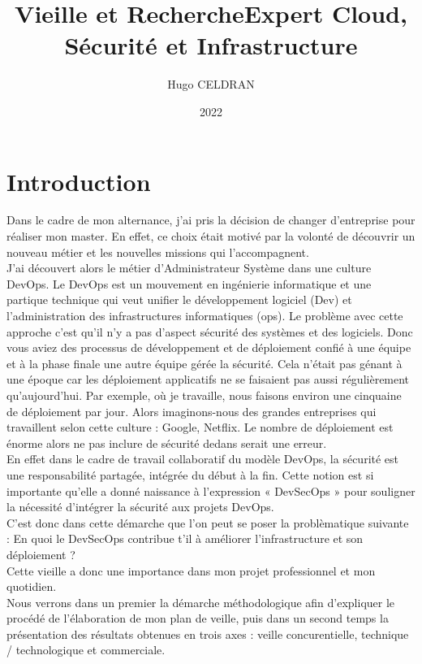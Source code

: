 \documentclass[11pt,a4paper,oneside]{book}
\author{Hugo CELDRAN}
\title{Vieille et Recherche}
\title{Expert Cloud, Sécurité et Infrastructure}
\date{2022}
\begin{document}
\maketitle
\tableofcontents


\chapter{Introduction}

Dans le cadre de mon alternance, j'ai pris la décision de changer d'entreprise pour réaliser mon master.
En effet, ce choix était motivé par la volonté de découvrir un nouveau métier et les nouvelles missions qui l'accompagnent. \\
J'ai découvert alors le métier d'Administrateur Système dans une culture DevOps.
Le DevOps est un mouvement en ingénierie informatique et une partique technique qui veut unifier le développement logiciel (Dev) et l'administration des infrastructures informatiques (ops).
Le problème avec cette approche c'est qu'il n'y a pas d'aspect sécurité des systèmes et des logiciels.
Donc vous aviez des processus de développement et de déploiement confié à une équipe et à la phase finale une autre équipe gérée la sécurité.
Cela n'était pas génant à une époque car les déploiement applicatifs ne se faisaient pas aussi régulièrement qu'aujourd'hui.
Par exemple, où je travaille, nous faisons environ une cinquaine de déploiement par jour. Alors imaginons-nous des grandes entreprises qui travaillent selon cette culture : Google, Netflix. Le nombre de déploiement est énorme alors ne pas inclure de sécurité dedans serait une erreur. \\
En effet dans le cadre de travail collaboratif du modèle DevOps, la sécurité est une responsabilité partagée, intégrée du début à la fin. Cette notion est si importante qu'elle a donné naissance à l'expression « DevSecOps » pour souligner la nécessité d'intégrer la sécurité aux projets DevOps. \\
C'est donc dans cette démarche que l'on peut se poser la problèmatique suivante : En quoi le DevSecOps contribue t'il à améliorer l'infrastructure et son déploiement ? \\
Cette vieille a donc une importance dans mon projet professionnel et mon quotidien. \\
Nous verrons dans un premier la démarche méthodologique afin d'expliquer le procédé de l'élaboration de mon plan de veille, puis dans un second temps la présentation des résultats obtenues en trois axes : veille concurentielle, technique / technologique et commerciale.
\end{document}
